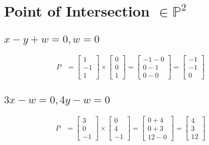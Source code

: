 \documentclass[12pt, oneside]{article}
\begin{document}
\section{Point of Intersection $\in \mathbb{P}^2$}  
\subsection{$x-y + w = 0, w = 0$}
  \begin{align*}
    P &= \begin{bmatrix}
           1 \\
           -1 \\
           1
         \end{bmatrix} \times 
          \begin{bmatrix}
                    0 \\
                    0 \\
                    1
                  \end{bmatrix}  
= 
 \begin{bmatrix}
                    -1 - 0 \\
                    0-1 \\
                    0 - 0
                  \end{bmatrix}                   
= 
 \begin{bmatrix}
                    -1  \\
                    -1 \\
                    0 
                  \end{bmatrix}                                                   
  \end{align*}
\subsection{$3x-w=0 , 4y - w = 0$}
  \begin{align*}
    P &= \begin{bmatrix}
           3 \\
           0 \\
           -1
         \end{bmatrix} \times 
          \begin{bmatrix}
                    0 \\
                    4 \\
                    -1
                  \end{bmatrix}  
= 
 \begin{bmatrix}
                    0+4 \\
                    0+3 \\
                    12-0
                  \end{bmatrix}                   
= 
 \begin{bmatrix}
                    4 \\
                    3 \\
                    12 
                  \end{bmatrix}                                                   
  \end{align*}
\end{document}
